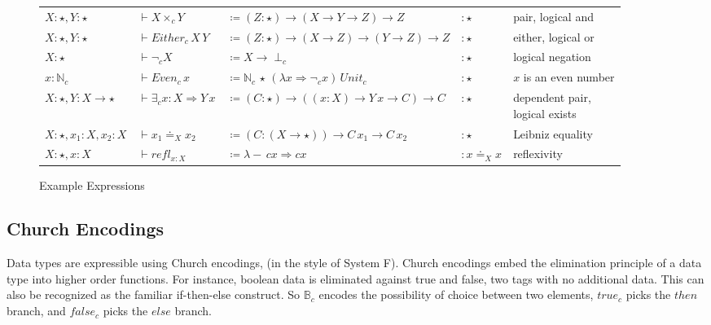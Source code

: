 \begin{sidewaysfigure}
\begin{tabular}{lllll}
$X:\star,Y:\star$ & $\vdash X\times_{c}Y$ & $\coloneqq\left(Z:\star\right)\rightarrow(X\rightarrow Y\rightarrow Z)\rightarrow Z$ & $:\star$ & pair, logical and\tabularnewline
$X:\star,Y:\star$ & $\vdash Either_{c}\,X\,Y$ & $\coloneqq\left(Z:\star\right)\rightarrow(X\rightarrow Z)\rightarrow(Y\rightarrow Z)\rightarrow Z$ & $:\star$ & either, logical or\tabularnewline
$X:\star$ & $\vdash\lnot_{c}X$ & $\coloneqq X\rightarrow\perp_{c}$ & $:\star$ & logical negation\tabularnewline
$x:\mathbb{N}_{c}$ & $\vdash Even_{c}\,x$ & $\coloneqq\mathbb{N}_{c}\,\star\,\left(\lambda x\Rightarrow\lnot_{c}x\right)\,Unit_{c}$ & $:\star$ & $x$ is an even number\tabularnewline
$X:\star,Y:X\rightarrow\star$ & $\vdash\exists_{c}x:X\Rightarrow Y\,x$ & $\coloneqq\left(C:\star\right)\rightarrow\left((x:X)\rightarrow Y\,x\rightarrow C\right)\rightarrow C$ & $:\star$ & \makecell[l]{dependent pair,\\ logical exists}\tabularnewline
$X:\star,x_{1}:X,x_{2}:X$ & $\vdash x_{1}\doteq_{X}x_{2}$ & $\coloneqq\left(C:\left(X\rightarrow\star\right)\right)\rightarrow C\,x_{1}\rightarrow C\,x_{2}$ & $:\star$ & Leibniz equality\tabularnewline
$X:\star,x:X$ & $\vdash refl_{x:X}$ & $\coloneqq\lambda-\,cx\Rightarrow cx$ & $:x\doteq_{X}x$ & reflexivity\tabularnewline
\end{tabular}


\caption{Example \SLang{} Expressions}
\label{fig:surface-examples}
\end{sidewaysfigure}

\subsection{Church Encodings}

Data types are expressible using Church encodings, (in the style of System F).
Church encodings embed the elimination principle of a data type into higher order functions.
For instance, boolean data is eliminated against true and false, two tags with no additional data.
This can also be recognized as the familiar if-then-else construct. 
So $\mathbb{B}_{c}$ encodes the possibility of choice between two elements, $true_{c}$ picks the $then$ branch, and $false_{c}$ picks the $else$ branch.


